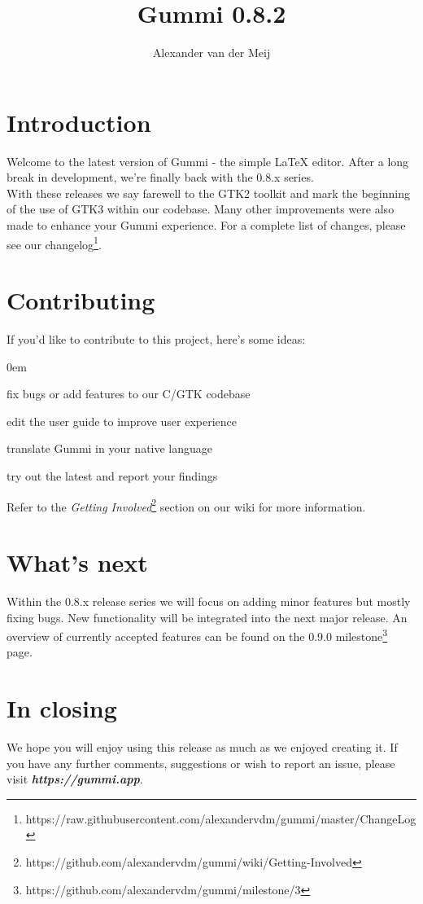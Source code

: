 \documentclass[11pt]{article}
\title{\textbf{Gummi 0.8.2}}
\author{Alexander van der Meij}
\date{}
\begin{document}
\maketitle
\thispagestyle{empty}

\section{Introduction}
Welcome to the latest version of Gummi - the simple {\LaTeX} editor. After a long break in development, we're finally back with the 0.8.x series.\\
With these releases we say farewell to the GTK2 toolkit and mark the beginning of the use of GTK3 within our codebase. Many other improvements were also made to enhance your Gummi experience. For a complete list of changes, please see our changelog\footnote{https://raw.githubusercontent.com/alexandervdm/gummi/master/ChangeLog}. 

\section{Contributing}
If you'd like to contribute to this project, here's some ideas:
\begin{description}
\addtolength{\itemindent}{0.80cm}
\itemsep0em 
\item[Development] fix bugs or add features to our C/GTK codebase
\item[Documentation] edit the user guide to improve user experience
\item[Localization] translate Gummi in your native language
\item[Testing] try out the latest and report your findings
\end{description}
Refer to the \emph{Getting Involved}\footnote{https://github.com/alexandervdm/gummi/wiki/Getting-Involved} section on our wiki for more information. 

\section{What's next}
Within the 0.8.x release series we will focus on adding minor features but mostly fixing bugs. New functionality will be integrated into the next major release. An overview of currently accepted features can be found on the 0.9.0 milestone\footnote{https://github.com/alexandervdm/gummi/milestone/3} page.

\section{In closing}
We hope you will enjoy using this release as much as we enjoyed creating it. If you have any further comments, suggestions or wish to report an issue, please visit \emph{\textbf{https://gummi.app}}. 
\end{document}
